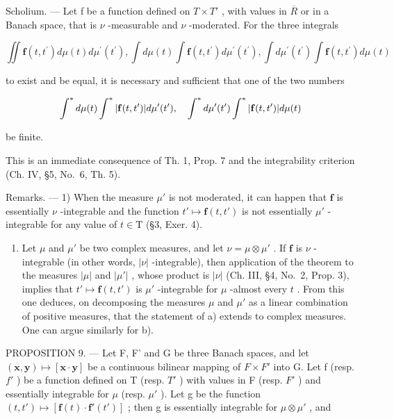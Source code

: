 Scholium. --- Let f be a function defined on \(T \times T'\) , with values in \(\overline{R}\) or in a Banach space, that is \(\nu\) -measurable and \(\nu\) -moderated. For the three integrals

\[
\iint \mathbf {f} (t, t ^ {\prime}) d \mu (t) d \mu^ {\prime} (t ^ {\prime}), \int d \mu (t) \int \mathbf {f} (t, t ^ {\prime}) d \mu^ {\prime} (t ^ {\prime}), \int d \mu^ {\prime} (t ^ {\prime}) \int \mathbf {f} (t, t ^ {\prime}) d \mu (t)
\]

to exist and be equal, it is necessary and sufficient that one of the two numbers

\[
\int^ {*} d \mu (t) \int^ {*} | {\bf f} (t, t ^ {\prime}) | d \mu^ {\prime} (t ^ {\prime}), \quad \int^ {*} d \mu^ {\prime} (t ^ {\prime}) \int^ {*} | {\bf f} (t, t ^ {\prime}) | d \mu (t)
\]

be finite.

This is an immediate consequence of Th. 1, Prop. 7 and the integrability criterion (Ch. IV, §5, No.~6, Th. 5).

Remarks. --- 1) When the measure \(\mu'\) is not moderated, it can happen that \(\mathbf{f}\) is essentially \(\nu\) -integrable and the function \(t' \mapsto \mathbf{f}(t, t')\) is not essentially \(\mu'\) -integrable for any value of \(t \in \mathrm{T}\) (§3, Exer. 4).

\begin{enumerate}
\def\labelenumi{\arabic{enumi})}
\setcounter{enumi}{1}
\tightlist
\item
  Let \(\mu\) and \(\mu'\) be two complex measures, and let \(\nu = \mu \otimes \mu'\) . If \(\mathbf{f}\) is \(\nu\) -integrable (in other words, \(|\nu|\) -integrable), then application of the theorem to the measures \(|\mu|\) and \(|\mu'|\) , whose product is \(|\nu|\) (Ch. III, §4, No.~2, Prop. 3), implies that \(t' \mapsto \mathbf{f}(t, t')\) is \(\mu'\) -integrable for \(\mu\) -almost every \(t\) . From this one deduces, on decomposing the measures \(\mu\) and \(\mu'\) as a linear combination of positive measures, that the statement of a) extends to complex measures. One can argue similarly for b).
\end{enumerate}

PROPOSITION 9. --- Let F, F' and G be three Banach spaces, and let \((\mathbf{x},\mathbf{y})\mapsto[\mathbf{x}\cdot\mathbf{y}]\) be a continuous bilinear mapping of \(F\times F'\) into G. Let f (resp. \(f'\) ) be a function defined on T (resp. \(T'\) ) with values in F (resp. \(F'\) ) and essentially integrable for \(\mu\) (resp. \(\mu'\) ). Let g be the function \((t,t')\mapsto[\mathbf{f}(t)\cdot\mathbf{f}'(t')]\) ; then g is essentially integrable for \(\mu\otimes\mu'\) , and

